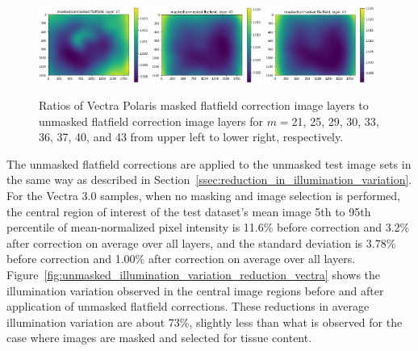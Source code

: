 \documentclass[letterpaper,11pt]{article}
\newcommand{\reffig}[1]{Figure~\ref{#1}}
\newcommand{\refsec}[1]{Section~\ref{#1}}
\begin{document}
\begin{figure}[!ht]
\includegraphics[width=0.32\textwidth]{images/results/masked_over_unmasked_flatfield_image_layers_polaris/masked_over_unmasked_flatfield_layer_37}
\includegraphics[width=0.32\textwidth]{images/results/masked_over_unmasked_flatfield_image_layers_polaris/masked_over_unmasked_flatfield_layer_40}
\includegraphics[width=0.32\textwidth]{images/results/masked_over_unmasked_flatfield_image_layers_polaris/masked_over_unmasked_flatfield_layer_43}
\caption{\footnotesize Ratios of Vectra Polaris masked flatfield correction image layers to unmasked flatfield correction image layers for $m=$21, 25, 29, 30, 33, 36, 37, 40, and 43 from upper left to lower right, respectively.}
\label{fig:masked_over_unmasked_flatfield_image_layers_polaris_2}
\end{figure}

The unmasked flatfield corrections are applied to the unmasked test image sets in the same way as described in \refsec{ssec:reduction_in_illumination_variation}. For the Vectra 3.0 samples, when no masking and image selection is performed, the central region of interest of the test dataset's mean image 5th to 95th percentile of mean-normalized pixel intensity is 11.6\% before correction and 3.2\% after correction on average over all layers, and the standard deviation is 3.78\% before correction and 1.00\% after correction on average over all layers. \reffig{fig:unmasked_illumination_variation_reduction_vectra} shows the illumination variation observed in the central image regions before and after application of unmasked flatfield corrections. These reductions in average illumination variation are about 73\%, slightly less than what is observed for the case where images are masked and selected for tissue content. 
\end{document}
